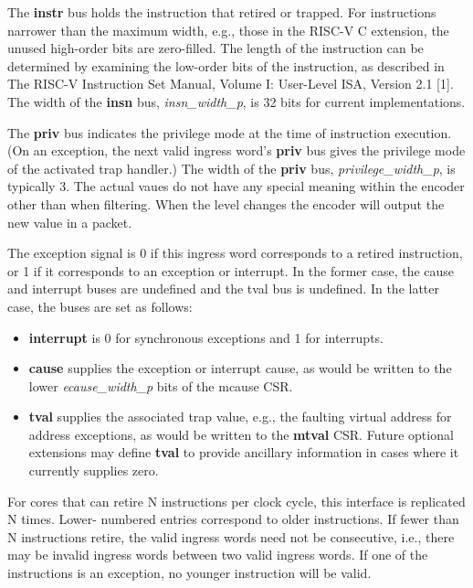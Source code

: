 The \textbf {instr} bus holds the instruction that retired or
trapped. For instructions narrower than the maximum width, e.g., those
in the RISC-V C extension, the unused high-order bits are
zero-filled. The length of the instruction can be determined by
examining the low-order bits of the instruction, as described in The
RISC-V Instruction Set Manual, Volume I: User-Level ISA, Version 2.1
[1]. The width of the \textbf {insn} bus, \textit {insn\_width\_p}, is 32 bits for current
implementations.

The \textbf {priv} bus indicates the privilege mode at the time of instruction
execution. (On an exception, the next valid ingress word's \textbf {priv} bus
gives the privilege mode of the activated trap handler.) The width of
the \textbf {priv} bus, \textit {privilege\_width\_p}, is typically 3. The actual vaues do not have any special meaning within the encoder other than when filtering. When the level changes the encoder will output the new value in a packet.

The exception signal is 0 if this ingress word corresponds to a retired
instruction, or 1 if it corresponds to an exception or interrupt.  In
the former case, the cause and interrupt buses are undefined and the
tval bus is undefined.  In the latter case, the buses are set as
follows:

\begin{itemize}
  \item \textbf {interrupt} is 0 for synchronous exceptions and 1 for
    interrupts.
  \item \textbf {cause} supplies the exception or interrupt cause, as
    would be written to the lower \textit {ecause\_width\_p} bits of the mcause CSR.
  \item \textbf {tval} supplies the associated trap value, e.g., the
    faulting virtual address for address exceptions, as would be
    written to the \textbf {mtval} CSR. Future optional extensions may define \textbf {tval} to provide ancillary information in cases where it currently supplies zero.  
\end{itemize}

For cores that can retire N instructions per clock cycle, this
interface is replicated N times.  Lower- numbered entries correspond
to older instructions.  If fewer than N instructions retire, the valid
ingress words need not be consecutive, i.e., there may be invalid
ingress words between two valid ingress words. If one of the
instructions is an exception, no younger instruction will be valid.

